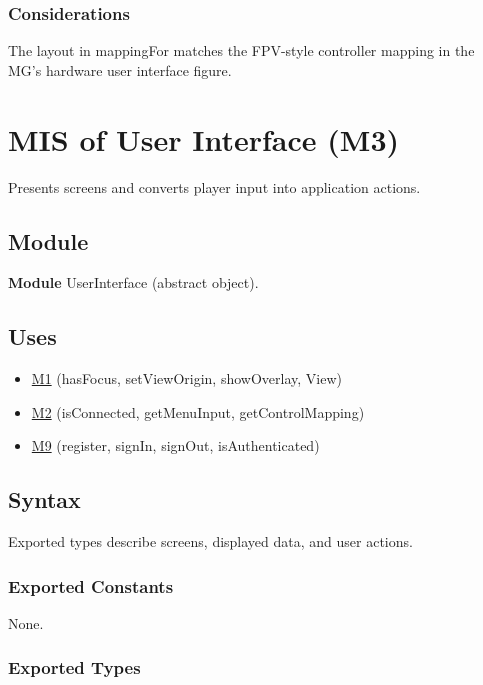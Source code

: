 \documentclass[12pt, titlepage]{article}
\newcommand{\Mref}[1]{\hyperref[sec:M#1]{M#1}}
\begin{document}
\subsubsection{Considerations}

The layout in mappingFor matches the FPV-style controller mapping in the MG's
hardware user interface figure.

\newpage
\section{MIS of User Interface (M3)} \label{sec:M3}

Presents screens and converts player input into application actions.

\subsection{Module}

\textbf{Module} UserInterface (abstract object).

\subsection{Uses}

\begin{itemize}
\item \Mref{1} (hasFocus, setViewOrigin, showOverlay, View)
\item \Mref{2} (isConnected, getMenuInput, getControlMapping)
\item \Mref{9} (register, signIn, signOut, isAuthenticated)
\end{itemize}

\subsection{Syntax}

Exported types describe screens, displayed data, and user actions.

\subsubsection{Exported Constants}

None.

\subsubsection{Exported Types}
\end{document}

